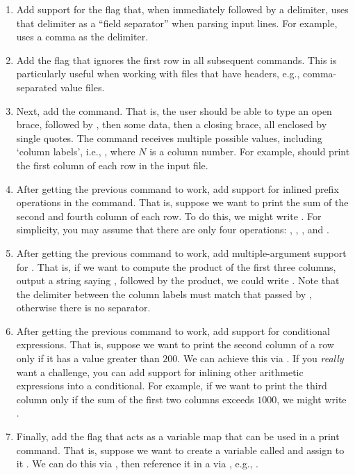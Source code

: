 \begin{enumerate}[label=(\alph*)]
    \item Add support for the  flag that, when immediately followed by a delimiter, uses that delimiter as a ``field separator'' when parsing input lines. For example,  uses a comma as the delimiter.
    \item Add the  flag that ignores the first row in all subsequent commands. This is particularly useful when working with files that have headers, e.g., comma-separated value files.
    \item Next, add the  command. That is, the user should be able to type an open brace, followed by , then some data, then a closing brace, all enclosed by single quotes. The  command receives multiple possible values, including `column labels', i.e., , where $N$ is a column number. For example,  should print the first column of each row in the input file. 
    \item After getting the previous command to work, add support for inlined prefix operations in the  command. That is, suppose we want to print the sum of the second and fourth column of each row. To do this, we might write . For simplicity, you may assume that there are only four operations: \ttt{\q{}+\q{}}, \ttt{\q{}-\q{}}, \ttt{\q{}*\q{}}, and \ttt{\q{}/\q{}}. 
    \item After getting the previous command to work, add multiple-argument support for . That is, if we want to compute the product of the first three columns, output a string saying , followed by the product, we could write . Note that the delimiter between the column labels must match that passed by , otherwise there is no separator.
    \item After getting the previous command to work, add support for conditional expressions. That is, suppose we want to print the second column of a row only if it has a value greater than $200$. We can achieve this via . If you \emph{really} want a challenge, you can add support for inlining other arithmetic expressions into a conditional. For example, if we want to print the third column only if the sum of the first two columns exceeds $1000$, we might write .
    \item Finally, add the  flag that acts as a variable map that can be used in a print command. That is, suppose we want to create a variable called  and assign to it . We can do this via , then reference it in a  via \ttt{\$}, e.g., .
\end{enumerate}

